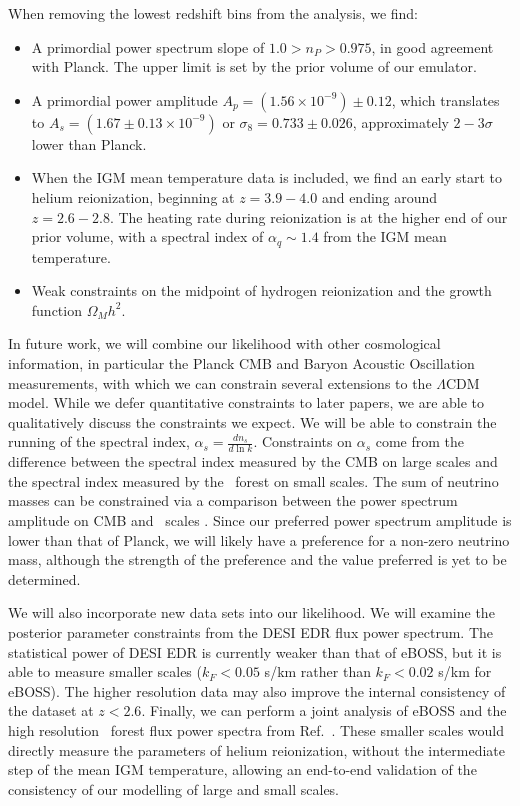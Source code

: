 When removing the lowest redshift bins from the analysis, we find:
\begin{itemize}
    \item A primordial power spectrum slope of $1.0 > n_P > 0.975$, in good agreement with Planck.
    The upper limit is set by the prior volume of our emulator.
    \item A primordial power amplitude $A_p=\left(1.56\times10^{-9}\right) \pm 0.12$, which translates to $A_s=\left(1.67\pm0.13\times10^{-9}\right)$ or $\sigma_8 = 0.733 \pm 0.026$, approximately $2-3\sigma$ lower than Planck.
    \item When the IGM mean temperature data is included, we find an early start to helium reionization, beginning at $z = 3.9-4.0$ and ending around $z=2.6-2.8$.
    The heating rate during reionization is at the higher end of our prior volume, with a spectral index of $\alpha_q \sim 1.4$ from the IGM mean temperature.  
    \item Weak constraints on the midpoint of hydrogen reionization and the growth function $\Omega_M h^2$.
\end{itemize}

In future work, we will combine our \Lya likelihood with other cosmological information, in particular the Planck CMB and Baryon Acoustic Oscillation measurements, with which we can constrain several extensions to the $\Lambda$CDM model.
While we defer quantitative constraints to later papers, we are able to qualitatively discuss the constraints we expect.
We will be able to constrain the running of the spectral index, $\alpha_s = \frac{d n_s}{d \ln k}$.
Constraints on $\alpha_s$ come from the difference between the spectral index measured by the CMB on large scales and the spectral index measured by the \Lya~forest on small scales.
The sum of neutrino masses can be constrained via a comparison between the power spectrum amplitude on CMB and \Lya~scales \cite{2020JCAP...04..025P}.
Since our preferred power spectrum amplitude is lower than that of Planck, we will likely have a preference for a non-zero neutrino mass, although the strength of the preference and the value preferred is yet to be determined.

We will also incorporate new data sets into our likelihood.
We will examine the posterior parameter constraints from the DESI EDR flux power spectrum.
The statistical power of DESI EDR is currently weaker than that of eBOSS, but it is able to measure smaller scales ($k_F < 0.05$ s/km rather than $k_F < 0.02$ s/km for eBOSS).
The higher resolution data may also improve the internal consistency of the dataset at $z < 2.6$.
Finally, we can perform a joint analysis of eBOSS and the high resolution \Lya~forest flux power spectra from Ref.~\cite{2022MNRAS.509.2842K}.
These smaller scales would directly measure the parameters of helium reionization, without the intermediate step of the mean IGM temperature, allowing an end-to-end validation of the consistency of our modelling of large and small scales.
